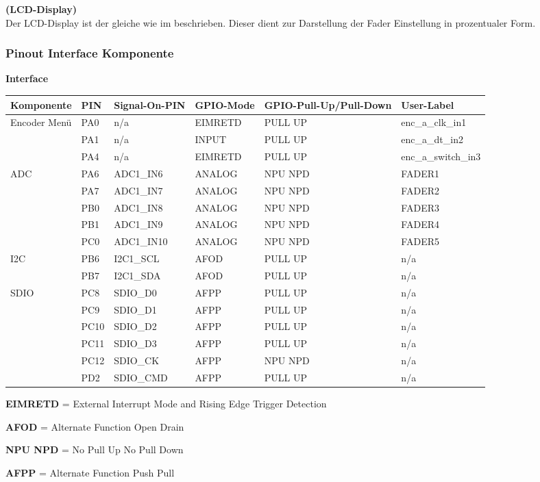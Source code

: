 \textbf{(LCD-Display)}\\

Der LCD-Display ist der gleiche wie im  beschrieben. Dieser dient zur Darstellung der Fader Einstellung in prozentualer Form.

\newpage

\subsubsection{Pinout Interface Komponente}

\textbf{Interface}

\begin{longtable}[c]{|p{2.5cm}|p{1cm}|p{2.5cm}|p{2.5cm}|p{2.5cm}|p{3cm}|}
	\hline
	\textbf{Komponente} & \textbf{PIN} & \textbf{Signal-On-PIN} &  \textbf{GPIO-Mode} & \textbf{GPIO-Pull-Up/Pull-Down } & \textbf{User-Label}\\
	\hline
	Encoder Menü & PA0 & n/a & EIMRETD & PULL UP & enc\_a\_clk\_in1 \\
	\hline
	& PA1 & n/a &  INPUT & PULL UP & enc\_a\_dt\_in2 \\
	\hline
	& PA4 & n/a & EIMRETD & PULL UP & enc\_a\_switch\_in3 \\
	\hline
	ADC & PA6 & ADC1\_IN6 & ANALOG & NPU NPD & FADER1 \\
	\hline
	& PA7 & ADC1\_IN7 & ANALOG & NPU NPD & FADER2 \\
	\hline
	& PB0 & ADC1\_IN8 & ANALOG & NPU NPD & FADER3 \\
	\hline
	& PB1 & ADC1\_IN9 & ANALOG & NPU NPD & FADER4 \\
	\hline
	& PC0 & ADC1\_IN10 & ANALOG & NPU NPD & FADER5 \\	
	\hline
	I2C & PB6 &I2C1\_SCL & AFOD & PULL UP & n/a \\
	\hline
	& PB7 &I2C1\_SDA & AFOD & PULL UP & n/a \\
	\hline
	SDIO & PC8 & SDIO\_D0 & AFPP & PULL UP & n/a \\
	\hline
	& PC9 & SDIO\_D1 & AFPP & PULL UP & n/a \\
	\hline
	& PC10 & SDIO\_D2 & AFPP & PULL UP & n/a \\
	\hline
	& PC11 & SDIO\_D3 & AFPP & PULL UP & n/a \\
	\hline
	& PC12 & SDIO\_CK & AFPP & NPU NPD & n/a \\
	\hline
	& PD2 & SDIO\_CMD & AFPP & PULL UP & n/a \\
	\hline
\end{longtable}

\textbf{EIMRETD} = External Interrupt Mode and Rising Edge Trigger Detection 		

\textbf{AFOD} = Alternate Function Open Drain

\textbf{NPU NPD} = No Pull Up No Pull Down		

\textbf{AFPP} = Alternate Function Push Pull

